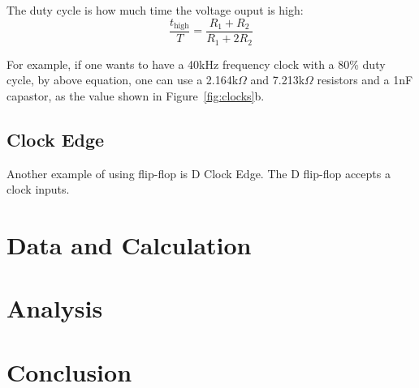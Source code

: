 \documentclass[aps,prl,reprint]{revtex4-1}
\begin{document}
            The duty cycle is how much time the voltage ouput is high:
            \[
            \frac{t_\text{high}}{T} = \frac{R_1 + R_2}{R_1 + 2R_2}
            \]

            For example, if one wants to have a 40kHz frequency clock with a 80\% duty cycle, by above equation, one can use a 2.164k$\Omega$ and 7.213k$\Omega$ resistors and a 1nF capastor, as the value shown in Figure~\ref{fig:clocks}b.
        \subsection{Clock Edge}
            Another example of using flip-flop is D Clock Edge. The D flip-flop accepts a clock inputs.

    
\section{Data and Calculation}

\section{Analysis}


\section{Conclusion}








\end{document}
